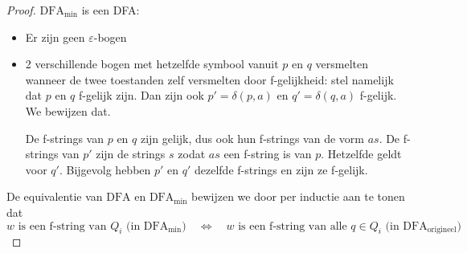 \documentclass[kulak]{kulakarticle}
\newcommand{\DFA}{\text{DFA}}
\theoremstyle{definition}
\begin{document}
	\begin{proof}
		\(\DFA_{\text{min}}\) is een DFA:
		\begin{itemize}
			\item Er zijn geen \(\varepsilon\)-bogen
			\item 2 verschillende bogen met hetzelfde symbool vanuit \(p\) en \(q\)  versmelten wanneer de twee toestanden zelf versmelten door f-gelijkheid:
			stel namelijk dat \(p\) en \(q\) f-gelijk zijn. Dan zijn ook \( p'=\delta(p,a) \) en \( q'=\delta(q,a) \) f-gelijk. We bewijzen dat.

			De f-strings van \(p\) en \(q\) zijn gelijk, dus ook hun f-strings van de vorm \(as\). De f-strings van \(p'\) zijn de strings \( s \) zodat \( as \) een f-string is van \( p \). Hetzelfde geldt voor \( q' \). Bijgevolg hebben \( p' \) en \( q' \) dezelfde f-strings en zijn ze f-gelijk.
		\end{itemize}

		De equivalentie van \(\DFA\) en \(\DFA_{\text{min}}\) bewijzen we door per inductie aan te tonen dat \[ w \text{ is een f-string van } Q_i \text{ (in } \DFA_{\text{min}} \text{)} \quad \Longleftrightarrow \quad w \text{ is een f-string van alle } q\in Q_i \text{ (in } \DFA_{\text{origineel}} \text{)}\]


\end{proof}
\end{document}
